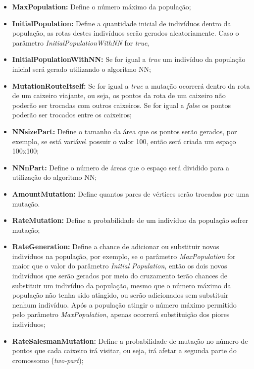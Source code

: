 \documentclass[12pt,openright,a4paper,oneside]{tcc}
\begin{document}
            \begin{itemize}
                \item \textbf{MaxPopulation:} Define o número máximo da população; 
                \item \textbf{InitialPopulation:} Define a quantidade inicial de indivíduos dentro da população, as rotas destes indivíduos serão gerados aleatoriamente. Caso o parâmetro \textit{InitialPopulationWithNN} for \textit{true}, 
                \item \textbf{InitialPopulationWithNN:} Se for igual a \textit{true} um indivíduo da população inicial será gerado utilizando o algoritmo NN;
                \item \textbf{MutationRouteItself:} Se for igual a \textit{true} a mutação ocorrerá dentro da rota de um caixeiro viajante, ou seja, os pontos da rota de um caixeiro não poderão ser trocadas com outros caixeiros. Se for igual a \textit{false} os pontos poderão ser trocados entre os caixeiros;
                \item \textbf{NNsizePart:} Define o tamanho da área que os pontos serão gerados, por exemplo, se está variável possuir o valor 100, então será criada um espaço 100x100;
                \item \textbf{NNnPart:} Define o número de áreas que o espaço será dividido para a utilização do algoritmo NN;
                \item \textbf{AmountMutation:} Define quantos pares de vértices serão trocados por uma mutação.
                \item \textbf{RateMutation:} Define a probabilidade de um indivíduo da população sofrer mutação;
                \item \textbf{RateGeneration:} Define a chance de adicionar ou substituir novos indivíduos na população, por exemplo, se o parâmetro \textit{MaxPopulation} for maior que o valor do parâmetro \textit{Initial Population}, então os dois novos indivíduos que serão gerados por meio do cruzamento terão chances de substituir um indivíduo da população, mesmo que o número máximo da população não tenha sido atingido, ou serão adicionados sem substituir nenhum indivíduo. Após a população atingir o número máximo permitido pelo parâmetro \textit{MaxPopulation}, apenas ocorrerá substituição dos piores indivíduos;
                \item \textbf{RateSalesmanMutation:} Define a probabilidade de mutação no número de pontos que cada caixeiro irá visitar, ou seja, irá afetar a segunda parte do cromossomo (\textit{two-part});

\end{itemize}
\end{document}
